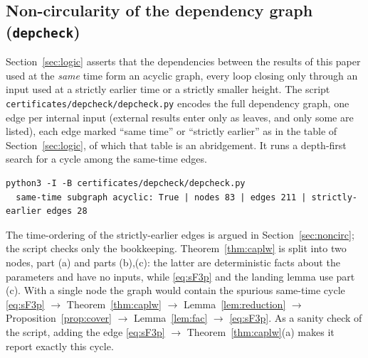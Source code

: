 \subsection{Non-circularity of the dependency graph (\texttt{depcheck})}\label{app:cert-dep}
Section~\ref{sec:logic} asserts that the dependencies between the results of this paper used at the \emph{same} time form an acyclic
graph, every loop closing only through an input used at a strictly earlier time or a strictly smaller height. The script
\texttt{certificates/depcheck/depcheck.py} encodes the full dependency graph, one edge per internal input (external results enter
only as leaves, and only some are listed), each edge marked ``same time'' or
``strictly earlier'' as in the table of Section~\ref{sec:logic}, of which that table is an abridgement. It runs a depth-first search for
a cycle among the same-time edges.
\begingroup\footnotesize
\begin{verbatim}
python3 -I -B certificates/depcheck/depcheck.py
  same-time subgraph acyclic: True | nodes 83 | edges 211 | strictly-earlier edges 28
\end{verbatim}
\endgroup
The time-ordering of the strictly-earlier edges is argued in Section~\ref{sec:noncirc}; the script checks only the bookkeeping.
Theorem~\ref{thm:caplw} is split into two nodes, part (a) and parts (b),(c): the latter are deterministic facts about the parameters
and have no inputs, while \ref{eq:sF3p} and the landing lemma use part (c). With a single node the graph would contain the spurious
same-time cycle \ref{eq:sF3p} $\to$ Theorem~\ref{thm:caplw} $\to$ Lemma~\ref{lem:reduction} $\to$ Proposition~\ref{prop:cover}
$\to$ Lemma~\ref{lem:fac} $\to$ \ref{eq:sF3p}. As a sanity check of the script, adding the edge
\ref{eq:sF3p} $\to$ Theorem~\ref{thm:caplw}(a) makes it report exactly this cycle.

